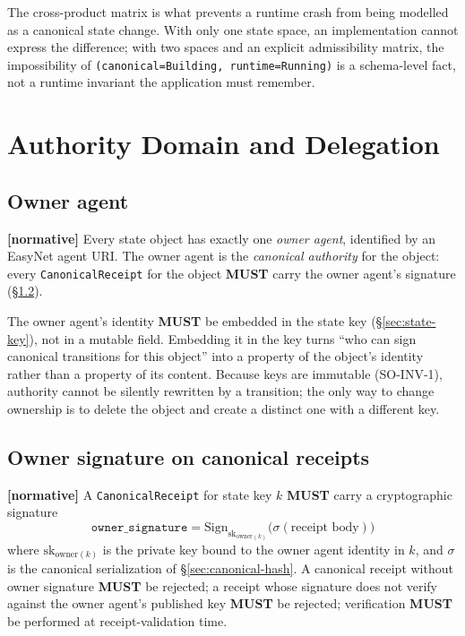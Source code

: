 \documentclass[11pt,a4paper]{article}
\newcommand{\normsv}{\textcolor{normativecolor}{\textbf{[normative]}}\xspace}
\theoremstyle{definition}
\begin{document}
\begin{notebox}
The cross-product matrix is what prevents a runtime crash from
being modelled as a canonical state change. With only one state
space, an implementation cannot express the difference; with two
spaces and an explicit admissibility matrix, the impossibility of
\texttt{(canonical=Building, runtime=Running)} is a schema-level
fact, not a runtime invariant the application must remember.
\end{notebox}

\section{Authority Domain and Delegation}
\label{sec:authority}

\subsection{Owner agent}

\normsv{}
Every state object has exactly one \emph{owner agent}, identified
by an EasyNet agent URI. The owner agent is the \emph{canonical
authority} for the object: every \texttt{CanonicalReceipt} for the
object \textbf{MUST} carry the owner agent's signature
(\S\ref{sec:owner-sig}).

The owner agent's identity \textbf{MUST} be embedded in the
state key (\S\ref{sec:state-key}), not in a mutable field.
Embedding it in the key turns ``who can sign canonical
transitions for this object'' into a property of the object's
identity rather than a property of its content. Because keys are
immutable (SO-INV-1), authority cannot be silently rewritten by a
transition; the only way to change ownership is to delete the
object and create a distinct one with a different key.

\subsection{Owner signature on canonical receipts}
\label{sec:owner-sig}

\normsv{}
A \texttt{CanonicalReceipt} for state key $k$ \textbf{MUST} carry
a cryptographic signature
\[
    \texttt{owner\_signature} = \mathrm{Sign}_{\mathrm{sk}_{\mathrm{owner}(k)}}\!\bigl(\sigma(\text{receipt body})\bigr)
\]
where $\mathrm{sk}_{\mathrm{owner}(k)}$ is the private key bound to
the owner agent identity in $k$, and $\sigma$ is the canonical
serialization of \S\ref{sec:canonical-hash}. A canonical receipt
without owner signature \textbf{MUST} be rejected; a receipt whose
signature does not verify against the owner agent's published key
\textbf{MUST} be rejected; verification \textbf{MUST} be performed
at receipt-validation time.
\end{document}
